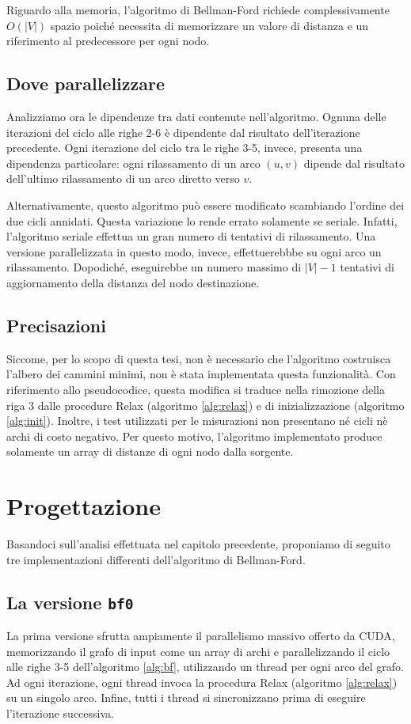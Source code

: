 \documentclass[12pt,a4paper,oneside]{book}
\begin{document}
	Riguardo alla memoria, l'algoritmo di Bellman-Ford richiede complessivamente $O(|V|)$ spazio poiché necessita di memorizzare un valore di distanza e un riferimento al predecessore per ogni nodo.
	
	\section{Dove parallelizzare}
	\label{section:dipendenze}
	Analizziamo ora le dipendenze tra dati contenute nell'algoritmo. Ognuna delle iterazioni del ciclo alle righe 2-6 è dipendente dal risultato dell'iterazione precedente. Ogni iterazione del ciclo tra le righe 3-5, invece, presenta una dipendenza particolare: ogni rilassamento di un arco $(u,v)$ dipende dal risultato dell'ultimo rilassamento di un arco diretto verso $v$.
	
	Alternativamente, questo algoritmo può essere modificato scambiando l'ordine dei due cicli annidati. Questa variazione lo rende errato solamente se seriale. Infatti, l'algoritmo seriale effettua un gran numero di tentativi di rilassamento. Una versione parallelizzata in questo modo, invece, effettuerebbbe su ogni arco un rilassamento. Dopodiché, eseguirebbe un numero massimo di $|V|-1$ tentativi di aggiornamento della distanza del nodo destinazione.
	
	\section{Precisazioni}
	Siccome, per lo scopo di questa tesi, non è necessario che l'algoritmo costruisca l'albero dei cammini minimi, non è stata implementata questa funzionalità. Con riferimento allo pseudocodice, questa modifica si traduce nella rimozione della riga 3 dalle procedure Relax (algoritmo \ref{alg:relax}) e di inizializzazione (algoritmo \ref{alg:init}). Inoltre, i test utilizzati per le misurazioni non presentano né cicli nè archi di costo negativo. Per questo motivo, l'algoritmo implementato produce solamente un array di distanze di ogni nodo dalla sorgente.
	
	\chapter{Progettazione}
	\label{chap:progettazione}
	Basandoci sull'analisi effettuata nel capitolo precedente, proponiamo di seguito tre implementazioni differenti dell'algoritmo di Bellman-Ford.
	
	\section{La versione \texttt{bf0}}
	La prima versione sfrutta ampiamente il parallelismo massivo offerto da CUDA, memorizzando il grafo di input come un array di archi e parallelizzando il ciclo alle righe 3-5 dell'algoritmo \ref{alg:bf}, utilizzando un thread per ogni arco del grafo. Ad ogni iterazione, ogni thread invoca la procedura Relax (algoritmo \ref{alg:relax}) su un singolo arco. Infine, tutti i thread si sincronizzano prima di eseguire l'iterazione successiva.
	
\end{document}
